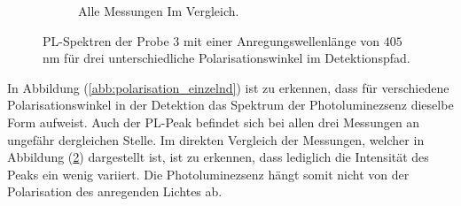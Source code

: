 \begin{figure}[H]
\begin{subfigure}[t]{0.4\textwidth}
	\caption{Alle Messungen Im Vergleich.}
	\label{abb:polarisation}
	\end{subfigure}
\caption{PL-Spektren der Probe 3 mit einer Anregungswellenl\"{a}nge von $405 \,$nm f\"{u}r drei unterschiedliche Polarisationswinkel im Detektionspfad.}
\end{figure}
In Abbildung (\ref{abb:polarisation_einzelnd}) ist zu erkennen, dass f\"{u}r verschiedene Polarisationswinkel in der Detektion das Spektrum der Photoluminezsenz dieselbe Form aufweist.
Auch der PL-Peak befindet sich bei allen drei Messungen an ungef\"{a}hr dergleichen Stelle.
Im direkten Vergleich der Messungen, welcher in Abbildung (\ref{abb:polarisation}) dargestellt ist, ist zu erkennen, dass lediglich die Intensit\"{a}t des Peaks ein wenig variiert.
Die Photoluminezsenz h\"{a}ngt somit nicht von der Polarisation des anregenden Lichtes ab.

